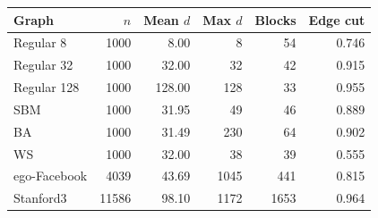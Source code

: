 \begin{tabular}{lrrrrr}\toprule
Graph & $n$ & Mean $d$ & Max $d$ & Blocks & Edge cut \\ \midrule
Regular 8 & 1000 & 8.00 & 8 & 54 & 0.746 \\
Regular 32 & 1000 & 32.00 & 32 & 42 & 0.915 \\
Regular 128 & 1000 & 128.00 & 128 & 33 & 0.955 \\
SBM & 1000 & 31.95 & 49 & 46 & 0.889 \\
BA & 1000 & 31.49 & 230 & 64 & 0.902 \\
WS & 1000 & 32.00 & 38 & 39 & 0.555 \\
ego-Facebook & 4039 & 43.69 & 1045 & 441 & 0.815 \\
Stanford3 & 11586 & 98.10 & 1172 & 1653 & 0.964 \\
\bottomrule\end{tabular}